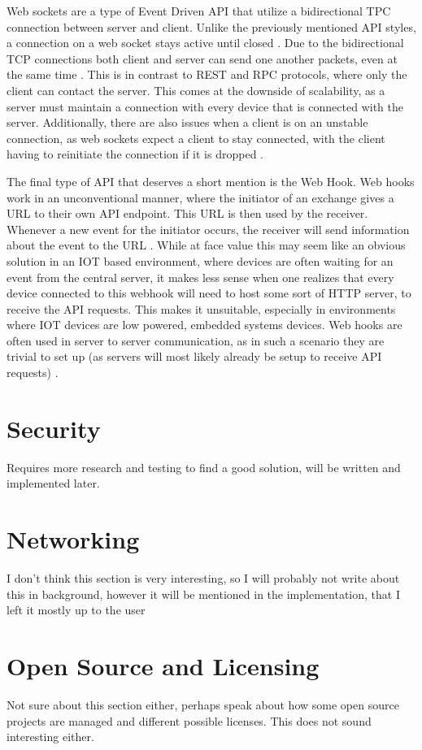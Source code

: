 Web sockets are a type of Event Driven API that utilize a bidirectional TPC connection between server and client. Unlike the previously mentioned API styles, a connection on a web socket stays active until closed \cite{WebsocketStandard}. Due to the bidirectional TCP connections both client and server can send one another packets, even at the same time \cite{DesigningWebApis}. This is in contrast to REST and RPC protocols, where only the client can contact the server. This comes at the downside of scalability, as a server must maintain a connection with every device that is connected with the server. Additionally, there are also issues when a client is on an unstable connection, as web sockets expect a client to stay connected, with the client having to reinitiate the connection if it is dropped \cite{DesigningWebApis}.

The final type of API that deserves a short mention is the Web Hook. Web hooks work in an unconventional manner, where the initiator of an exchange gives a URL to their own API endpoint. This URL is then used by the receiver. Whenever a new event for the initiator occurs, the receiver will send information about the event to the URL \cite{DesigningWebApis}. While at face value this may seem like an obvious solution in an IOT based environment, where devices are often waiting for an event from the central server, it makes less sense when one realizes that every device connected to this webhook will need to host some sort of HTTP server, to receive the API requests. This makes it unsuitable, especially in environments where IOT devices are low powered, embedded systems devices. Web hooks are often used in server to server communication, as in such a scenario they are trivial to set up (as servers will most likely already be setup to receive API requests) \cite{DesigningWebApis}.

\section{Security} \label{sec:chap2:security}
Requires more research and testing to find a good solution, will be written and implemented later.

\section{Networking} \label{sec:chap2:networking}
I don't think this section is very interesting, so I will probably not write about this in background, however it will be mentioned in the implementation, that I left it mostly up to the user

\section{Open Source and Licensing} \label{sec:chap2:opensource}
Not sure about this section either, perhaps speak about how some open source projects are managed and different possible licenses. This does not sound interesting either.
